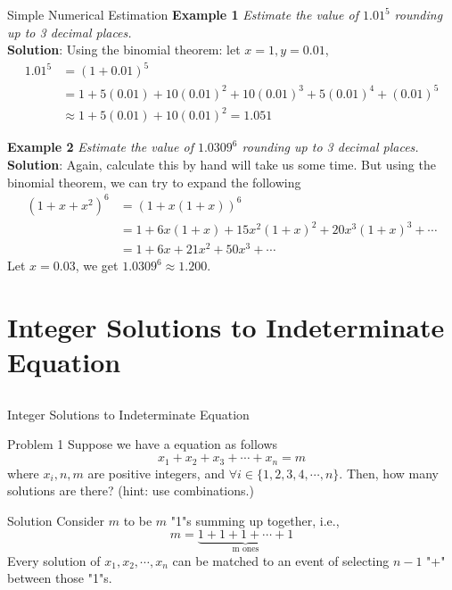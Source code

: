 \documentclass{beamer}
\begin{document}
\begin{frame}{Simple Numerical Estimation}
\textbf{Example 1}  \textit{Estimate the value of $1.01^5$ rounding up to 3 decimal places.}\\
\textbf{Solution}:  Using the binomial theorem: let $x=1,y=0.01$,
\begin{displaymath}
\begin{split}
1.01^5 & =(1+0.01)^5\\
& = 1+5(0.01)+10(0.01)^2+10(0.01)^3+5(0.01)^4+(0.01)^5\\
& \approx 1+5(0.01)+10(0.01)^2 = 1.051
\end{split}
\end{displaymath}

\textbf{Example 2}  \textit{Estimate the value of $1.0309^6$ rounding up to 3 decimal places.}\\
\textbf{Solution}:  Again, calculate this by hand will take us some time. But using the binomial theorem, we can try to expand the following
\begin{displaymath}
\begin{split}
(1+x+x^2)^6 & =(1+x(1+x))^6\\
& = 1+6x(1+x)+15x^2(1+x)^2+20x^3(1+x)^3+\cdots\\
& = 1+6x+21x^2+50x^3+\cdots
\end{split}
\end{displaymath}
Let $x=0.03$, we get $1.0309^6\approx1.200$.
\end{frame}

\section{Integer Solutions to Indeterminate Equation}

\subsection{}

\begin{frame}{Integer Solutions to Indeterminate Equation}
\begin{block}{Problem 1}
Suppose we have a equation as follows
$$x_1+x_2+x_3+\cdots+x_n=m$$
where $x_i,n,m$ are positive integers, and $\forall i \in \{1,2,3,4,\cdots,n\}$. Then, how many solutions are there? (hint: use combinations.)
\end{block}
\begin{block}{Solution}
Consider $m$ to be $m$ "1"s summing up together, i.e.,
$$m=\underbrace{1+1+1+\cdots+1}_{\text{m ones}}$$
Every solution of ${x_1,x_2,\cdots,x_n}$ can be matched to an event of selecting $n-1$ "+" between those "1"s.
\end{block}

\end{frame}
\end{document}
